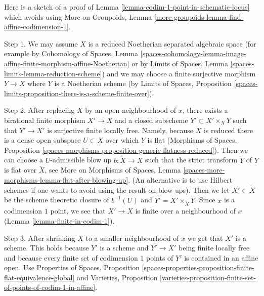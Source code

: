 \begin{remark}
\label{remark-alternate-proof-scheme-codim-1}
Here is a sketch of a proof of
Lemma \ref{lemma-codim-1-point-in-schematic-locus}
which avoids using
More on Groupoids, Lemma
\ref{more-groupoids-lemma-find-affine-codimension-1}.

\medskip\noindent
Step 1. We may assume $X$ is a reduced Noetherian separated algebraic space
(for example by Cohomology of Spaces, Lemma
\ref{spaces-cohomology-lemma-image-affine-finite-morphism-affine-Noetherian}
or by
Limits of Spaces, Lemma \ref{spaces-limits-lemma-reduction-scheme})
and we may choose a finite surjective morphism
$Y \to X$ where $Y$ is a Noetherian scheme (by
Limits of Spaces, Proposition
\ref{spaces-limits-proposition-there-is-a-scheme-finite-over}).

\medskip\noindent
Step 2. After replacing $X$ by an open neighbourhood of $x$, there
exists a birational finite morphism $X' \to X$ and a closed subscheme
$Y' \subset X' \times_X Y$ such that $Y' \to X'$ is surjective
finite locally free. Namely, because $X$ is reduced there is a dense
open subspace $U \subset X$ over which $Y$ is flat (Morphisms of Spaces,
Proposition \ref{spaces-morphisms-proposition-generic-flatness-reduced}).
Then we can choose a $U$-admissible blow up $b : \tilde X \to X$ such
that the strict transform $\tilde Y$ of $Y$ is flat over $\tilde X$, see
More on Morphisms of Spaces, Lemma
\ref{spaces-more-morphisms-lemma-flat-after-blowing-up}.
(An alternative is to use Hilbert schemes if one wants to avoid using
the result on blow ups).
Then we let $X' \subset \tilde X$ be the scheme theoretic
closure of $b^{-1}(U)$ and $Y' = X' \times_{\tilde X} \tilde Y$.
Since $x$ is a codimension $1$ point, we see that $X' \to X$ is finite over a
neighbourhood of $x$ (Lemma \ref{lemma-finite-in-codim-1}).

\medskip\noindent
Step 3. After shrinking $X$ to a smaller neighbourhood of $x$ we get that
$X'$ is a scheme. This holds because $Y'$ is a scheme and $Y' \to X'$
being finite locally free and because every finite set of codimension $1$
points of $Y'$ is contained in an affine open. Use
Properties of Spaces, Proposition
\ref{spaces-properties-proposition-finite-flat-equivalence-global}
and
Varieties, Proposition
\ref{varieties-proposition-finite-set-of-points-of-codim-1-in-affine}.


\end{remark}
